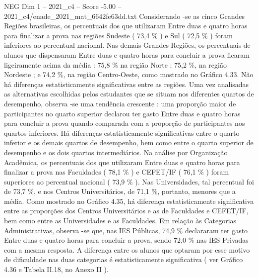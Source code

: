 \begin{textsample}{NEG Dim 1 – 2021\_c4 – Score -5.00 – 2021\_c4/enade\_2021\_mat\_6642fe63dd.txt}
Considerando -se as cinco Grandes Regiões brasileiras, os percentuais dos que utilizaram Entre duas e quatro horas para finalizar a prova nas regiões Sudeste ( 73,4 \% ) e Sul ( 72,5 \% ) foram inferiores ao percentual nacional.
Nas demais Grandes Regiões, os percentuais de alunos que dispensaram Entre duas e quatro horas para concluir a prova ficaram ligeiramente acima da média : 75,8 \% na região Norte ; 75,2 \%, na região Nordeste ; e 74,2 \%, na região Centro-Oeste, como mostrado no Gráfico 4.33.
Não há diferenças estatisticamente significativas entre as regiões.
Uma vez analisadas as alternativas escolhidas pelos estudantes que se situam nos diferentes quartos de desempenho, observa -se uma tendência crescente : uma proporção maior de participantes no quarto superior declarou ter gasto Entre duas e quatro horas para concluir a prova quando comparada com a proporção de participantes nos quartos inferiores.
Há diferenças estatisticamente significativas entre o quarto inferior e os demais quartos de desempenho, bem como entre o quarto superior de desempenho e os dois quartos intermediários.
Na análise por Organização Acadêmica, os percentuais dos que utilizaram Entre duas e quatro horas para finalizar a prova nas Faculdades ( 78,1 \% ) e CEFET/IF ( 76,1 \% ) foram superiores ao percentual nacional ( 73,9 \% ).
Nas Universidades, tal percentual foi de 73,7 \%, e nos Centros Universitários, de 71,1 \%, portanto, menores que a média.
Como mostrado no Gráfico 4.35, há diferença estatisticamente significativa entre as proporções dos Centros Universitários e as de Faculdades e CEFET/IF, bem como entre as Universidades e as Faculdades.
Em relação às Categorias Administrativas, observa -se que, nas IES Públicas, 74,9 \% declararam ter gasto Entre duas e quatro horas para concluir a prova, sendo 72,0 \% nas IES Privadas com a mesma resposta.
A diferença entre os alunos que optaram por esse motivo de dificuldade nas duas categorias é estatisticamente significativa ( ver Gráfico 4.36 e Tabela II.18, no Anexo II ).

\end{textsample}
